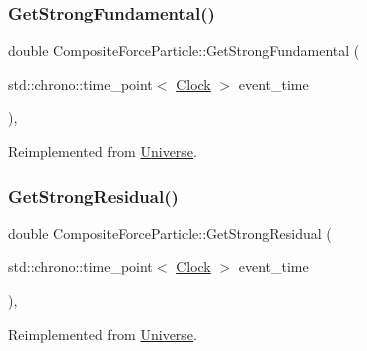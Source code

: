\subsubsection{\texorpdfstring{Get\+Strong\+Fundamental()}{GetStrongFundamental()}}
{\footnotesize\ttfamily double Composite\+Force\+Particle\+::\+Get\+Strong\+Fundamental (\begin{DoxyParamCaption}\item[{std\+::chrono\+::time\+\_\+point$<$ \mbox{\hyperlink{universe_8h_a0ef8d951d1ca5ab3cfaf7ab4c7a6fd80}{Clock}} $>$}]{event\+\_\+time }\end{DoxyParamCaption})\hspace{0.3cm}{\ttfamily [inline]}, {\ttfamily [virtual]}}



Reimplemented from \mbox{\hyperlink{classUniverse_ab44daccba01ee7e3cf9b50bba83dd19e}{Universe}}.

\mbox{\label{classCompositeForceParticle_a24214566eb5b44340d5563b6583052e8}} 
\subsubsection{\texorpdfstring{Get\+Strong\+Residual()}{GetStrongResidual()}}
{\footnotesize\ttfamily double Composite\+Force\+Particle\+::\+Get\+Strong\+Residual (\begin{DoxyParamCaption}\item[{std\+::chrono\+::time\+\_\+point$<$ \mbox{\hyperlink{universe_8h_a0ef8d951d1ca5ab3cfaf7ab4c7a6fd80}{Clock}} $>$}]{event\+\_\+time }\end{DoxyParamCaption})\hspace{0.3cm}{\ttfamily [inline]}, {\ttfamily [virtual]}}



Reimplemented from \mbox{\hyperlink{classUniverse_af0f4b81950061e63c2855eb40957a5b1}{Universe}}.

\mbox{\label{classCompositeForceParticle_ab5cc0893a4063cc353ea5d2404f27b0b}} 
